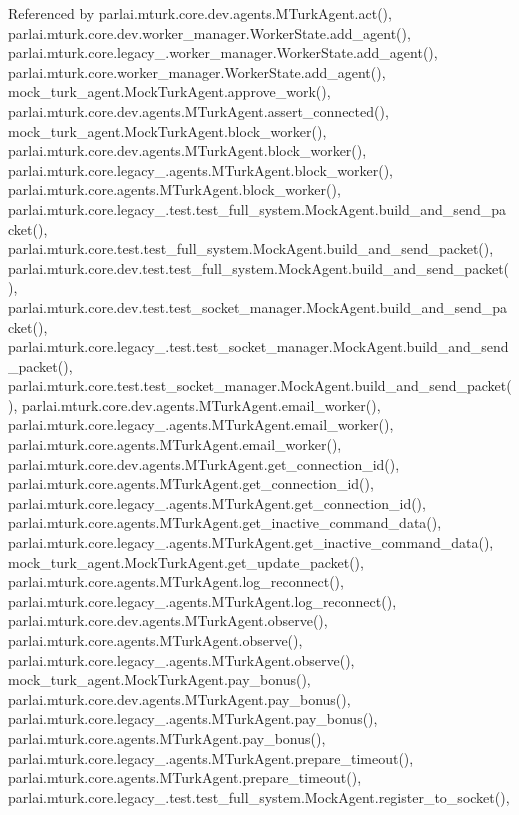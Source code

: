 Referenced by parlai.\+mturk.\+core.\+dev.\+agents.\+M\+Turk\+Agent.\+act(), parlai.\+mturk.\+core.\+dev.\+worker\+\_\+manager.\+Worker\+State.\+add\+\_\+agent(), parlai.\+mturk.\+core.\+legacy\+\_.\+worker\+\_\+manager.\+Worker\+State.\+add\+\_\+agent(), parlai.\+mturk.\+core.\+worker\+\_\+manager.\+Worker\+State.\+add\+\_\+agent(), mock\+\_\+turk\+\_\+agent.\+Mock\+Turk\+Agent.\+approve\+\_\+work(), parlai.\+mturk.\+core.\+dev.\+agents.\+M\+Turk\+Agent.\+assert\+\_\+connected(), mock\+\_\+turk\+\_\+agent.\+Mock\+Turk\+Agent.\+block\+\_\+worker(), parlai.\+mturk.\+core.\+dev.\+agents.\+M\+Turk\+Agent.\+block\+\_\+worker(), parlai.\+mturk.\+core.\+legacy\+\_.\+agents.\+M\+Turk\+Agent.\+block\+\_\+worker(), parlai.\+mturk.\+core.\+agents.\+M\+Turk\+Agent.\+block\+\_\+worker(), parlai.\+mturk.\+core.\+legacy\+\_.\+test.\+test\+\_\+full\+\_\+system.\+Mock\+Agent.\+build\+\_\+and\+\_\+send\+\_\+packet(), parlai.\+mturk.\+core.\+test.\+test\+\_\+full\+\_\+system.\+Mock\+Agent.\+build\+\_\+and\+\_\+send\+\_\+packet(), parlai.\+mturk.\+core.\+dev.\+test.\+test\+\_\+full\+\_\+system.\+Mock\+Agent.\+build\+\_\+and\+\_\+send\+\_\+packet(), parlai.\+mturk.\+core.\+dev.\+test.\+test\+\_\+socket\+\_\+manager.\+Mock\+Agent.\+build\+\_\+and\+\_\+send\+\_\+packet(), parlai.\+mturk.\+core.\+legacy\+\_.\+test.\+test\+\_\+socket\+\_\+manager.\+Mock\+Agent.\+build\+\_\+and\+\_\+send\+\_\+packet(), parlai.\+mturk.\+core.\+test.\+test\+\_\+socket\+\_\+manager.\+Mock\+Agent.\+build\+\_\+and\+\_\+send\+\_\+packet(), parlai.\+mturk.\+core.\+dev.\+agents.\+M\+Turk\+Agent.\+email\+\_\+worker(), parlai.\+mturk.\+core.\+legacy\+\_.\+agents.\+M\+Turk\+Agent.\+email\+\_\+worker(), parlai.\+mturk.\+core.\+agents.\+M\+Turk\+Agent.\+email\+\_\+worker(), parlai.\+mturk.\+core.\+dev.\+agents.\+M\+Turk\+Agent.\+get\+\_\+connection\+\_\+id(), parlai.\+mturk.\+core.\+agents.\+M\+Turk\+Agent.\+get\+\_\+connection\+\_\+id(), parlai.\+mturk.\+core.\+legacy\+\_.\+agents.\+M\+Turk\+Agent.\+get\+\_\+connection\+\_\+id(), parlai.\+mturk.\+core.\+agents.\+M\+Turk\+Agent.\+get\+\_\+inactive\+\_\+command\+\_\+data(), parlai.\+mturk.\+core.\+legacy\+\_.\+agents.\+M\+Turk\+Agent.\+get\+\_\+inactive\+\_\+command\+\_\+data(), mock\+\_\+turk\+\_\+agent.\+Mock\+Turk\+Agent.\+get\+\_\+update\+\_\+packet(), parlai.\+mturk.\+core.\+agents.\+M\+Turk\+Agent.\+log\+\_\+reconnect(), parlai.\+mturk.\+core.\+legacy\+\_.\+agents.\+M\+Turk\+Agent.\+log\+\_\+reconnect(), parlai.\+mturk.\+core.\+dev.\+agents.\+M\+Turk\+Agent.\+observe(), parlai.\+mturk.\+core.\+agents.\+M\+Turk\+Agent.\+observe(), parlai.\+mturk.\+core.\+legacy\+\_.\+agents.\+M\+Turk\+Agent.\+observe(), mock\+\_\+turk\+\_\+agent.\+Mock\+Turk\+Agent.\+pay\+\_\+bonus(), parlai.\+mturk.\+core.\+dev.\+agents.\+M\+Turk\+Agent.\+pay\+\_\+bonus(), parlai.\+mturk.\+core.\+legacy\+\_.\+agents.\+M\+Turk\+Agent.\+pay\+\_\+bonus(), parlai.\+mturk.\+core.\+agents.\+M\+Turk\+Agent.\+pay\+\_\+bonus(), parlai.\+mturk.\+core.\+legacy\+\_.\+agents.\+M\+Turk\+Agent.\+prepare\+\_\+timeout(), parlai.\+mturk.\+core.\+agents.\+M\+Turk\+Agent.\+prepare\+\_\+timeout(), parlai.\+mturk.\+core.\+legacy\+\_.\+test.\+test\+\_\+full\+\_\+system.\+Mock\+Agent.\+register\+\_\+to\+\_\+socket(), 